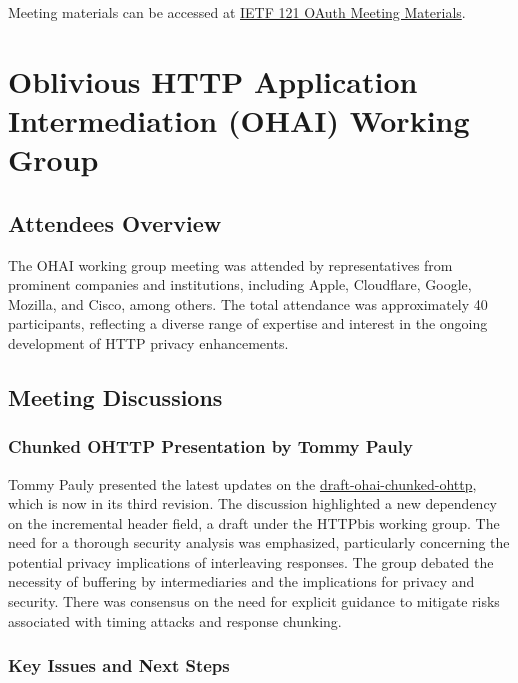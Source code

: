 \documentclass{article}
\begin{document}
Meeting materials can be accessed at \href{https://datatracker.ietf.org/meeting/121/materials/slides-121-oauth-oauth-identity-and-authorization-chaining-across-domains-00}{IETF 121 OAuth Meeting Materials}.




\newpage

\section{Oblivious HTTP Application Intermediation (OHAI) Working Group}

\subsection{Attendees Overview}

The OHAI working group meeting was attended by representatives from prominent companies and institutions, including Apple, Cloudflare, Google, Mozilla, and Cisco, among others. The total attendance was approximately 40 participants, reflecting a diverse range of expertise and interest in the ongoing development of HTTP privacy enhancements.

\subsection{Meeting Discussions}

\subsubsection{Chunked OHTTP Presentation by Tommy Pauly}

Tommy Pauly presented the latest updates on the \href{https://datatracker.ietf.org/doc/html/draft-ohai-chunked-ohttp}{draft-ohai-chunked-ohttp}, which is now in its third revision. The discussion highlighted a new dependency on the incremental header field, a draft under the HTTPbis working group. The need for a thorough security analysis was emphasized, particularly concerning the potential privacy implications of interleaving responses. The group debated the necessity of buffering by intermediaries and the implications for privacy and security. There was consensus on the need for explicit guidance to mitigate risks associated with timing attacks and response chunking.

\subsubsection{Key Issues and Next Steps}
\end{document}
